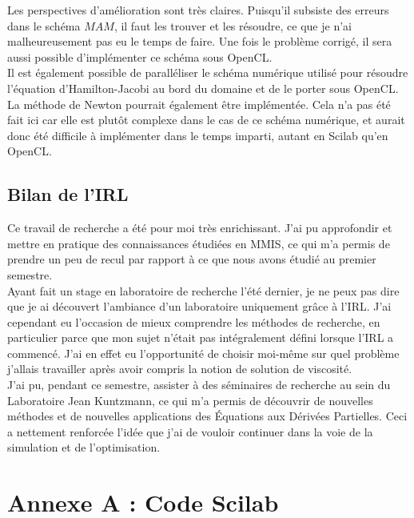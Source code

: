 \documentclass[12pt,a4paper,twoside]{article}
\begin{document}
Les perspectives d'amélioration sont très claires. Puisqu'il subsiste des erreurs dans le schéma $MAM$, il faut
les trouver et les résoudre, ce que je n'ai malheureusement pas eu le temps de faire. Une fois le problème 
corrigé, il sera aussi possible d'implémenter ce schéma sous OpenCL. \\

Il est également possible de paralléliser
le schéma numérique utilisé pour résoudre l'équation d'Hamilton-Jacobi au bord du domaine et de le porter sous OpenCL. \\

La méthode de Newton pourrait également être implémentée. Cela n'a pas été fait ici car elle est plutôt 
complexe dans le cas de ce schéma numérique, et aurait donc été difficile à implémenter dans le temps imparti,
autant en Scilab qu'en OpenCL.

\subsection{Bilan de l'IRL}

Ce travail de recherche a été pour moi très enrichissant. J'ai pu approfondir et mettre en pratique des 
connaissances étudiées en MMIS, ce qui m'a permis de prendre un peu de recul par rapport à ce que nous
avons étudié au premier semestre. \\

Ayant fait un stage en laboratoire de recherche l'été dernier, je ne peux pas dire que je ai découvert l'ambiance
d'un laboratoire uniquement grâce à l'IRL. J'ai cependant eu l'occasion de mieux comprendre les méthodes de 
recherche, en particulier parce que mon sujet n'était pas intégralement défini lorsque l'IRL a commencé. 
J'ai en effet eu l'opportunité de choisir moi-même sur quel problème j'allais travailler après avoir compris
la notion de solution de viscosité. \\

J'ai pu, pendant ce semestre, assister à des séminaires de recherche au sein du Laboratoire Jean Kuntzmann, ce qui 
m'a permis de découvrir de nouvelles méthodes et de nouvelles applications des Équations aux Dérivées Partielles.
Ceci a nettement renforcée l'idée que j'ai de vouloir continuer dans la voie de la simulation et de l'optimisation.


\newpage




\newpage
\section{Annexe A : Code Scilab}
\end{document}
